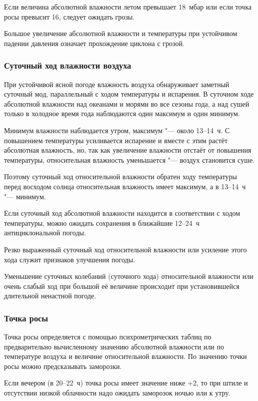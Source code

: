  Если величина абсолютной влажности летом превышает 18~мбар или
если точка росы превысит 16\grC, следует ожидать грозы.

 Большое увеличение абсолютной влажности и температуры при
устойчивом падении давления означает прохождение циклона с грозой.

\subsubsection{Суточный ход влажности воздуха}

При устойчивой ясной погоде влажность воздуха обнаруживает заметный
суточный мод, параллельный с ходом температуры и испарения. В суточном
ходе абсолютной влажности над океанами и морями во все сезоны года, а
над сушей только в холодное время года наблюдаются один максимум и
один минимум.

Минимум влажности наблюдается утром, максимум "--- около 13--14~ч. С
повышением температуры усиливается испарение и вместе с этим растёт
абсолютная влажность, но, так как увеличение влажности отстаёт от
повышения температуры, относительная влажность уменьшается "--- воздух
становится суше.

Поэтому суточный ход относительной влажности обратен ходу температуры
перед восходом солнца относительная влажность имеет максимум, а в
13--14~ч "--- минимум.

 Если суточный ход абсолютной влажности находится в
соответствии с ходом температуры, можно ожидать сохранения в ближайшие
12--24~ч антициклональной погоды.

 Резко выраженный суточный ход относительной влажности или
усиление этого хода служит признаков улучшения погоды.

 Уменьшение суточных колебаний (суточного хода) относительной
влажности или очень слабый ход при большой её величине происходит при
установившейся длительной ненастной погоде.

\subsubsection{Точка росы}

Точка росы определяется с помощью психрометрических таблиц по
предварительно вычисленному значению абсолютной влажности или по
температуре воздуха и величине относительной влажности. По значению
точки росы можно предсказывать заморозки.

 Если вечером (в 20--22~ч) точка росы имеет значение ниже +2\grC, то
при штиле и отсутствии низкой облачности надо ожидать заморозок ночью
или к утру.

